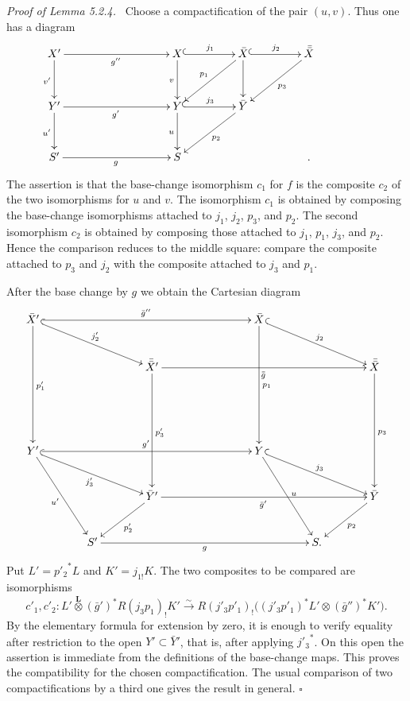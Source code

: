 \documentclass[12pt]{article}
\newcommand{\otimesL}{\mathbin{\overset{\mathbf L}{\otimes}}}
\newcommand{\qedtext}{\hfill\(\square\)}
\newenvironment{prooftext}[1][Proof]{\par\noindent\emph{#1.}\ }{\par\medskip}
\begin{document}
\begin{prooftext}[Proof of Lemma 5.2.4]
Choose a compactification of the pair \((u,v)\). Thus one has a diagram
\[
\xymatrix@C=1.55cm@R=1.1cm{
X'\ar[rr]_{g''}\ar[d]_{v'} && X\ar@{^{(}->}[r]^{j_1}\ar[d]_{v} & \bar X\ar[ld]_{p_1}\ar@{^{(}->}[r]^{j_2}\ar[d] & \bar{\bar X}\ar[ld]^{p_3}\\
Y'\ar[rr]_{g'}\ar[d]_{u'} && Y\ar@{^{(}->}[r]^{j_3}\ar[d]_{u} & \bar Y\ar[ld]^{p_2} &&\\
S'\ar[rr]_{g} && S && .
}
\]
The assertion is that the base-change isomorphism \(c_1\) for \(f\) is the composite \(c_2\) of the two isomorphisms for \(u\) and \(v\). The isomorphism \(c_1\) is obtained by composing the base-change isomorphisms attached to \(j_1\), \(j_2\), \(p_3\), and \(p_2\). The second isomorphism \(c_2\) is obtained by composing those attached to \(j_1\), \(p_1\), \(j_3\), and \(p_2\). Hence the comparison reduces to the middle square: compare the composite attached to \(p_3\) and \(j_2\) with the composite attached to \(j_3\) and \(p_1\).

After the base change by \(g\) we obtain the Cartesian diagram
\[
\xymatrix@C=1.3cm@R=.95cm{
\bar X'\ar[ddd]^{p'_1}\ar[rrrr]^{\bar g''}\ar@{^{(}->}[rrd]^{j'_2} &&&& \bar X\ar@{^{(}->}[rrd]^{j_2}\ar[ddd]^{p_1}\\
&& \bar{\bar X}'\ar[rrrr]_{\bar{\bar g}}\ar[ddd]^{p'_3} &&&& \bar{\bar X}\ar[ddd]^{p_3}\\
&&&\\
Y'\ar@{^{(}->}[rrd]_{j'_3}\ar[rrrr]^{g'}\ar[rdd]_{u'} &&&&Y\ar[rdd]^{u}\ar@{^{(}->}[rrd]^{j_3}\\
&&\bar Y'\ar[rrrr]_{\bar g'}\ar[ld]^{p'_2} &&&& \bar Y\ar[ld]^{p_2}\\
&S'\ar[rrrr]_{g} &&&& S .
}
\]
Put \(L'={p'_2}^{*}L\) and \(K'=j_{1!}K\). The two composites to be compared are isomorphisms
\[
c'_1,c'_2:
L'\otimesL (\bar g')^{*}R(j_3p_1)_!K'
\xrightarrow{\sim}
R(j'_3p'_1)_!\bigl((j'_3p'_1)^*L'\otimes (\bar g'')^{*}K'\bigr).
\]
By the elementary formula for extension by zero, it is enough to verify equality after restriction to the open \(Y'\subset \bar Y'\), that is, after applying \({j'_3}^{*}\). On this open the assertion is immediate from the definitions of the base-change maps. This proves the compatibility for the chosen compactification. The usual comparison of two compactifications by a third one gives the result in general. \qedtext
\end{prooftext}
\end{document}
